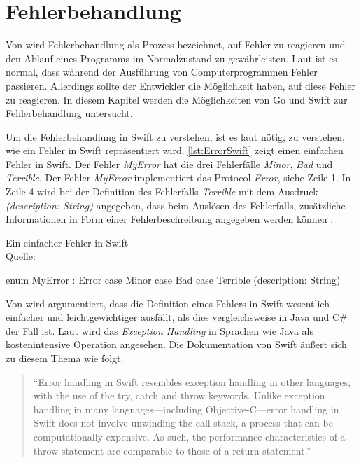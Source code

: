 \chapter{Fehlerbehandlung}
Von \cite[S.310]{Apple.2017} wird Fehlerbehandlung als Prozess bezeichnet, auf Fehler zu reagieren und den Ablauf eines Programms im Normalzustand zu gewährleisten.
Laut \cite[S.77]{Manning.2016} ist es normal, dass während der Ausführung von Computerprogrammen Fehler passieren. 
Allerdings sollte der Entwickler die Möglichkeit haben, auf diese Fehler zu reagieren. 
In diesem Kapitel werden die Möglichkeiten von Go und Swift zur Fehlerbehandlung untersucht.


Um die Fehlerbehandlung in Swift zu verstehen, ist es laut \cite[S.175]{Hoffman.2017} nötig, zu verstehen, wie ein Fehler in Swift repräsentiert wird.
\autoref{lst:ErrorSwift} zeigt einen einfachen Fehler in Swift.
Der Fehler \textit{MyError} hat die drei Fehlerfälle \textit{Minor}, \textit{Bad} und \textit{Terrible}.
Der Fehler \textit{MyError} implementiert das Protocol \textit{Error}, siehe Zeile 1. 
In Zeile 4 wird bei der Definition des Fehlerfalls \textit{Terrible} mit dem Ausdruck \textit{(description: String)} angegeben, dass beim Auslösen des Fehlerfalls, zusätzliche Informationen in Form einer Fehlerbeschreibung angegeben werden können \cite[S.175]{Hoffman.2017}.

\begin{listing}[H]
\caption{Ein einfacher Fehler in Swift \\ Quelle:\cite[S.175]{Hoffman.2017}}
\label{lst:ErrorSwift}
\begin{SwiftCode}
enum MyError : Error {
    case Minor
    case Bad 
    case Terrible (description: String)
}
\end{SwiftCode}
\end{listing}

Von \cite[S.175]{Hoffman.2017} wird argumentiert, dass die Definition eines Fehlers in Swift wesentlich einfacher und leichtgewichtiger ausfällt, als dies vergleichsweise in Java und C\# der Fall ist.
Laut \cite[]{JavaExceptions} wird das \textit{Exception Handling} in Sprachen wie Java als kostenintensive Operation angesehen.
Die Dokumentation von Swift äußert sich zu diesem Thema wie folgt.

\begin{quote}
\enquote{Error handling in Swift resembles exception handling in other languages, with the use of the try, catch and throw
keywords. Unlike exception handling in many languages—including Objective-C—error handling in Swift does not involve
unwinding the call stack, a process that can be computationally expensive. As such, the performance characteristics of a
throw statement are comparable to those of a return statement.} \cite[S.311]{Apple.2017}
\end{quote}

